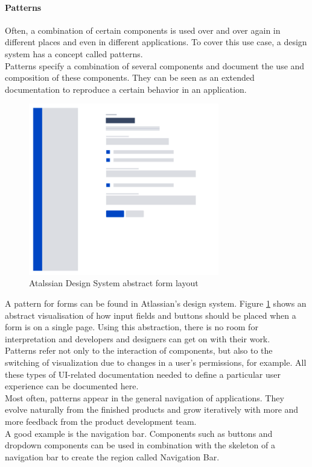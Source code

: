 \paragraph{Patterns} \label{patterns}
Often, a combination of certain components is used over and over again in different places and even in different applications. To cover this use case, a design system has a concept called patterns.\\ 
Patterns specify a combination of several components and document the use and composition of these components. They can be seen as an extended documentation to reproduce a certain behavior in an application. 
\\
\begin{figure}[hbtp]
	\centerline{\includegraphics[height=7.5cm]{images/atlassian_abstract_form.png}}
	\caption{Atalssian Design System abstract form layout \cite{atlassian_design_system_atlassian_nodate}}
	\label{atlassian_form_layout}
\end{figure}
A pattern for forms can be found in Atlassian's design system. Figure \ref{atlassian_form_layout} shows an abstract visualisation of how input fields and buttons should be placed when a form is on a single page. Using this abstraction, there is no room for interpretation and developers and designers can get on with their work. \\
Patterns refer not only to the interaction of components, but also to the switching of visualization due to changes in a user's permissions, for example. All these types of UI-related documentation needed to define a particular user experience can be documented here.   \cite{vesselov_building_2019}
\\
Most often, patterns appear in the general navigation of applications. They evolve naturally from the finished products and grow iteratively with more and more feedback from the product development team.
\\
A good example is the navigation bar. Components such as buttons and dropdown components can be used in combination with the skeleton of a navigation bar to create the region called Navigation Bar. 
